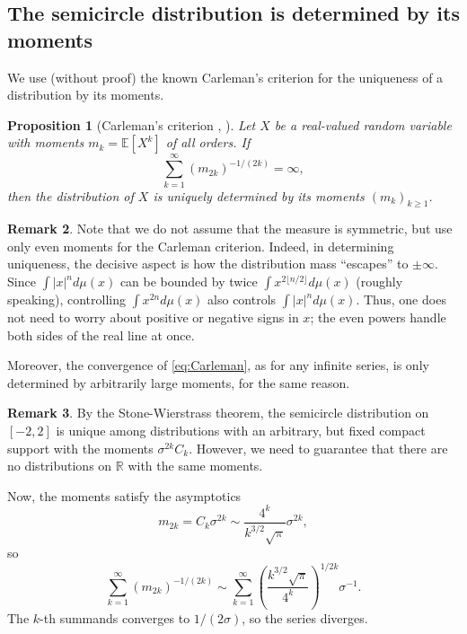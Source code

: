 \documentclass[letterpaper,11pt,oneside,reqno]{article}
\numberwithin{equation}{section}
\newtheorem{proposition}{Proposition}[section]
\theoremstyle{definition}
\newtheorem{remark}[proposition]{Remark}
\begin{document}
\subsection{The semicircle distribution is determined by its moments}
\label{sub:carleman-semicircle}

We use (without proof)
the known Carleman's criterion for the uniqueness of a distribution by its moments.
\begin{proposition}[Carleman's criterion
	{\cite[Theorem~1.10]{shohat1943problem}}, \cite{Akhiezer1965Moment}]
	\label{prop:carleman}
	Let $X$ be a real-valued random variable with moments $m_k
	= \mathbb{E}[X^k]$ of all orders. If
	\begin{equation}
		\label{eq:Carleman}
		\sum_{k=1}^{\infty}
		(m_{2k})^{-1/(2k)} = \infty,
	\end{equation}
	then the distribution of
	$X$ is uniquely determined by its moments $(m_k)_{k\geq 1}$.
\end{proposition}
\begin{remark}
Note that we do not assume that the measure is symmetric,
but use only even moments for the Carleman criterion.
Indeed,
in determining uniqueness, the decisive aspect is how the
distribution mass ``escapes'' to \(\pm \infty\). Since
\(\int |x|^n d\mu(x)\) can be bounded by twice \(\int x^{2
\lfloor n/2 \rfloor} d\mu(x)\) (roughly speaking),
controlling \(\int x^{2n} d\mu(x)\) also controls \(\int
|x|^n d\mu(x)\). Thus, one does not need to worry about
positive or negative signs in \(x\); the even powers handle
both sides of the real line at once.

Moreover, the convergence of \eqref{eq:Carleman},
as for any infinite series, is only determined
by arbitrarily large moments, for the same reason.
\end{remark}
\begin{remark}
	By the Stone-Wierstrass theorem,
	the semicircle distribution on $[-2,2]$ is
	unique among distributions
	with an
	arbitrary, but fixed compact support with the moments
	$\sigma^{2k} C_k$.
	However, we need to guarantee that there are no
	distributions on $\mathbb{R}$ with the same moments.
\end{remark}

Now, the moments satisfy the asymptotics
\begin{equation*}
	m_{2k}=C_k \sigma^{2k} \sim
	\frac{4^k}{k^{3/2}\sqrt{\pi}} \sigma^{2k},
\end{equation*}
so
\begin{equation*}
	\sum_{k=1}^{\infty} (m_{2k})^{-1/(2k)} \sim
	\sum_{k=1}^{\infty} \left( \frac{k^{3/2}\sqrt{\pi}}{4^k} \right)^{1/2k} \sigma^{-1}.
\end{equation*}
The $k$-th summands converges to $1/(2\sigma)$, so the
series diverges.
\end{document}
